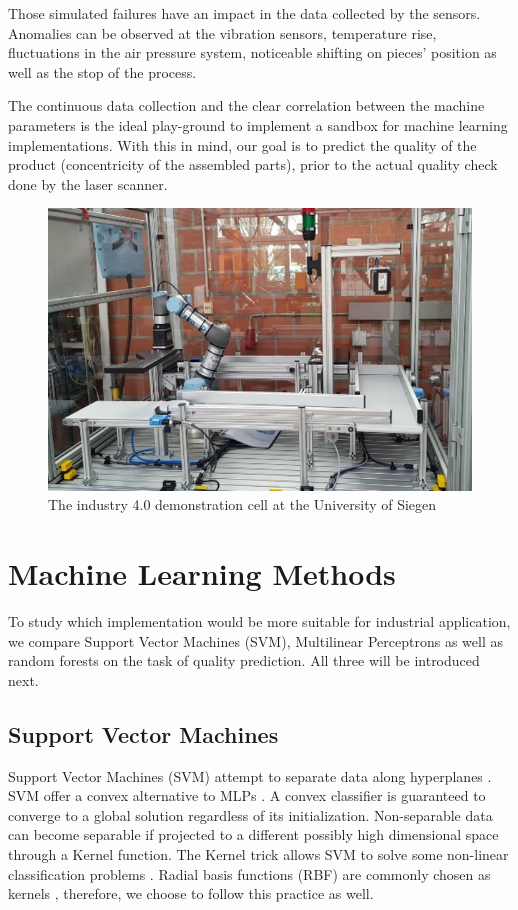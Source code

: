 \documentclass[5p,times,procedia]{elsarticle}
\begin{document}
Those simulated failures have an impact in the data collected by the sensors. Anomalies can be observed at the vibration sensors, temperature rise, fluctuations in the air pressure system, noticeable shifting on pieces' position as well as the stop of the process.

The continuous data collection and the clear correlation between the machine parameters is the ideal play-ground to implement a sandbox for machine learning implementations. With this in mind, our goal is to predict the quality of the product (concentricity of the assembled parts), prior to the actual quality check done by the laser scanner. 


\begin{figure}
       \includegraphics[width=.45\textwidth]{img/demozelle}
       \caption{The industry 4.0 demonstration cell at the University of Siegen}
\label{fig:ind_cell}
\end{figure}

\section{Machine Learning Methods} \label{sec:ML} %

To study which implementation would be more suitable for industrial application, we compare Support Vector Machines (SVM), Multilinear Perceptrons as well as random forests on the task of quality prediction. All three will be introduced next.

\subsection{Support Vector Machines}
Support Vector Machines (SVM) attempt to separate data
along hyperplanes \cite{aggarwal2015data}. 
SVM offer a convex alternative to MLPs \cite{Suykens2002least}.
A convex classifier is guaranteed to converge to a global solution
regardless of its initialization.
Non-separable data can become separable if projected to a different
possibly high dimensional space through a Kernel function.
The Kernel trick allows SVM to solve some non-linear
classification problems \cite{Suykens2002least}.
Radial basis functions (RBF) are commonly chosen as kernels
\cite{Suykens2002least}, therefore, we choose to follow this practice as well.
\end{document}
